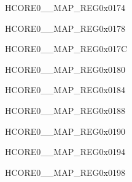 \begin{register}{H}{CORE0\_\_MAP\_REG}{0x0174}\label{regdesc:CORE0USBOTGINTMAPREG}
\end{register}\vspace{-3em}


\begin{register}{H}{CORE0\_\_MAP\_REG}{0x0178}\label{regdesc:CORE0USBOTGENDPMULTIPROCINTMAPREG}
\end{register}\vspace{-3em}


\begin{register}{H}{CORE0\_\_MAP\_REG}{0x017C}\label{regdesc:CORE0JPEGINTMAPREG}
\end{register}\vspace{-3em}


\begin{register}{H}{CORE0\_\_MAP\_REG}{0x0180}\label{regdesc:CORE0PPAINTMAPREG}
\end{register}\vspace{-3em}


\begin{register}{H}{CORE0\_\_MAP\_REG}{0x0184}\label{regdesc:CORE0CORE0TRACEINTMAPREG}
\end{register}\vspace{-3em}


\begin{register}{H}{CORE0\_\_MAP\_REG}{0x0188}\label{regdesc:CORE0CORE1TRACEINTMAPREG}
\end{register}\vspace{-3em}




\begin{register}{H}{CORE0\_\_MAP\_REG}{0x0190}\label{regdesc:CORE0ISPINTMAPREG}
\end{register}\vspace{-3em}


\begin{register}{H}{CORE0\_\_MAP\_REG}{0x0194}\label{regdesc:CORE0I3CMSTINTMAPREG}
\end{register}\vspace{-3em}


\begin{register}{H}{CORE0\_\_MAP\_REG}{0x0198}\label{regdesc:CORE0I3CSLVINTMAPREG}
\end{register}\vspace{-3em}


